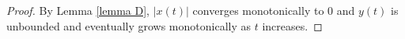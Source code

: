 \documentclass{amsart}
\numberwithin{equation}{section}
\theoremstyle{plain}
\theoremstyle{definition}
\theoremstyle{remark}
\numberwithin{table}{section}
\begin{document}
\begin{proof}
    By Lemma \ref{lemma D}, $|x(t)|$ converges monotonically to $0$ and $y(t)$ is unbounded and eventually grows monotonically as $t$ increases.
%
%
%
%
%

\end{proof}
\end{document}
